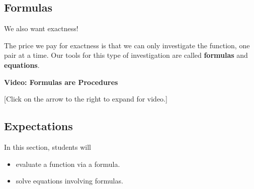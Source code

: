 \documentclass{ximera}
\begin{document}
\subsection{Formulas}
We also want exactness!

The price we pay for exactness is that we can only investigate the function, one pair at a time.  Our tools for this type of investigation are called \textbf{formulas} and \textbf{equations}.








\begin{explanation} \textbf{Video: Formulas are Procedures}

[Click on the arrow to the right to expand for video.]
\begin{expandable} 

\begin{center}
\end{center}

\end{expandable}
\end{explanation}






\subsection{Expectations}

\begin{sectionOutcomes}
In this section, students will 

\begin{itemize}
\item evaluate a function via a formula.
\item solve equations involving formulas.
\end{itemize}
\end{sectionOutcomes}
\end{document}
